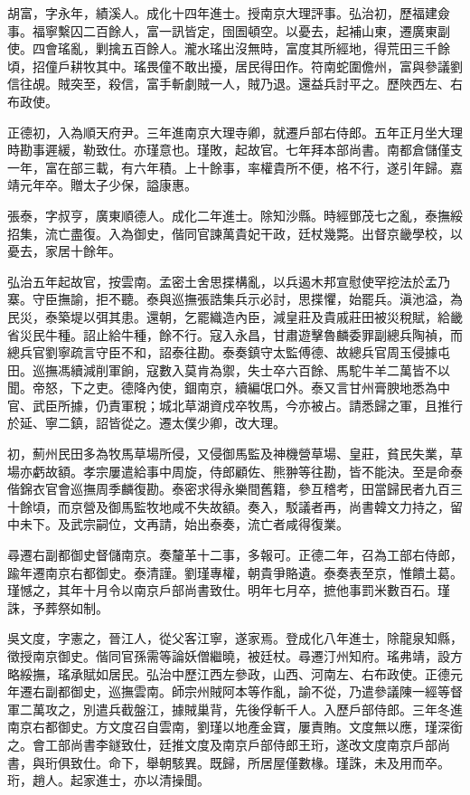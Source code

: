 \begin{pinyinscope}
胡富，字永年，績溪人。成化十四年進士。授南京大理評事。弘治初，歷福建僉事。福寧繫囚二百餘人，富一訊皆定，囹圄頓空。以憂去，起補山東，遷廣東副使。四會瑤亂，剿擒五百餘人。瀧水瑤出沒無時，富度其所經地，得荒田三千餘頃，招僮戶耕牧其中。瑤畏僮不敢出擾，居民得田作。符南蛇圍儋州，富與參議劉信往覘。賊突至，殺信，富手斬劇賊一人，賊乃退。還益兵討平之。歷陜西左、右布政使。

正德初，入為順天府尹。三年進南京大理寺卿，就遷戶部右侍郎。五年正月坐大理時勘事遲緩，勒致仕。亦瑾意也。瑾敗，起故官。七年拜本部尚書。南都倉儲僅支一年，富在部三載，有六年積。上十餘事，率權貴所不便，格不行，遂引年歸。嘉靖元年卒。贈太子少保，謚康惠。

張泰，字叔亨，廣東順德人。成化二年進士。除知沙縣。時經鄧茂七之亂，泰撫綏招集，流亡盡復。入為御史，偕同官諫萬貴妃干政，廷杖幾斃。出督京畿學校，以憂去，家居十餘年。

弘治五年起故官，按雲南。孟密土舍思揲構亂，以兵遏木邦宣慰使罕挖法於孟乃寨。守臣撫諭，拒不聽。泰與巡撫張誥集兵示必討，思揲懼，始罷兵。滇池溢，為民災，泰築堤以弭其患。還朝，乞罷織造內臣，減皇莊及貴戚莊田被災稅賦，給畿省災民牛種。詔止給牛種，餘不行。寇入永昌，甘肅遊擊魯麟委罪副總兵陶禎，而總兵官劉寧疏言守臣不和，詔泰往勘。泰奏鎮守太監傅德、故總兵官周玉侵據屯田。巡撫馮續減削軍餉，寇數入莫肯為禦，失士卒六百餘、馬駝牛羊二萬皆不以聞。帝怒，下之吏。德降內使，錮南京，續編氓口外。泰又言甘州膏腴地悉為中官、武臣所據，仍責軍稅；城北草湖資戍卒牧馬，今亦被占。請悉歸之軍，且推行於延、寧二鎮，詔皆從之。遷太僕少卿，改大理。

初，薊州民田多為牧馬草場所侵，又侵御馬監及神機營草場、皇莊，貧民失業，草場亦虧故額。孝宗屢遣給事中周旋，侍郎顧佐、熊翀等往勘，皆不能決。至是命泰偕錦衣官會巡撫周季麟復勘。泰密求得永樂間舊籍，參互稽考，田當歸民者九百三十餘頃，而京營及御馬監牧地咸不失故額。奏入，駁議者再，尚書韓文力持之，留中未下。及武宗嗣位，文再請，始出泰奏，流亡者咸得復業。

尋遷右副都御史督儲南京。奏釐革十二事，多報可。正德二年，召為工部右侍郎，踰年遷南京右都御史。泰清謹。劉瑾專權，朝貴爭賂遺。泰奏表至京，惟饋土葛。瑾憾之，其年十月令以南京戶部尚書致仕。明年七月卒，摭他事罰米數百石。瑾誅，予葬祭如制。

吳文度，字憲之，晉江人，從父客江寧，遂家焉。登成化八年進士，除龍泉知縣，徵授南京御史。偕同官孫需等論妖僧繼曉，被廷杖。尋遷汀州知府。瑤弗靖，設方略綏撫，瑤承賦如居民。弘治中歷江西左參政，山西、河南左、右布政使。正德元年遷右副都御史，巡撫雲南。師宗州賊阿本等作亂，諭不從，乃遣參議陳一經等督軍二萬攻之，別遣兵截盤江，據賊巢背，先後俘斬千人。入歷戶部侍郎。三年冬進南京右都御史。方文度召自雲南，劉瑾以地產金寶，屢責賄。文度無以應，瑾深銜之。會工部尚書李鐩致仕，廷推文度及南京戶部侍郎王珩，遂改文度南京戶部尚書，與珩俱致仕。命下，舉朝駭異。既歸，所居屋僅數椽。瑾誅，未及用而卒。珩，趙人。起家進士，亦以清操聞。


\end{pinyinscope}
